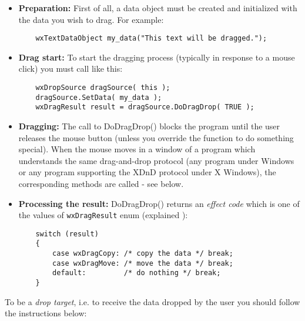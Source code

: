 \begin{itemize}\itemsep=0pt
\item {\bf Preparation:} First of all, a data object must be created and
initialized with the data you wish to drag. For example:

\begin{verbatim}
	wxTextDataObject my_data("This text will be dragged.");
\end{verbatim}
\item{\bf Drag start:} To start the dragging process (typically in response to a
mouse click) you must call 
like this:

\begin{verbatim}
	wxDropSource dragSource( this );
	dragSource.SetData( my_data );
	wxDragResult result = dragSource.DoDragDrop( TRUE );
\end{verbatim}
\item {\bf Dragging:} The call to DoDragDrop() blocks the program until the user releases the
mouse button (unless you override the  function
to do something special). When the mouse moves in a window of a program which understands the
same drag-and-drop protocol (any program under Windows or any program supporting the
XDnD protocol under X Windows), the corresponding  methods
are called - see below.
\item {\bf Processing the result:} DoDragDrop() returns an {\it effect code} which
is one of the values of {\tt wxDragResult} enum (explained ):

\begin{verbatim}
	switch (result)
	{
	    case wxDragCopy: /* copy the data */ break;
	    case wxDragMove: /* move the data */ break;
	    default:         /* do nothing */ break;
	}
\end{verbatim}%
\end{itemize}

To be a {\it drop target}, i.e. to receive the data dropped by the user you should
follow the instructions below:

